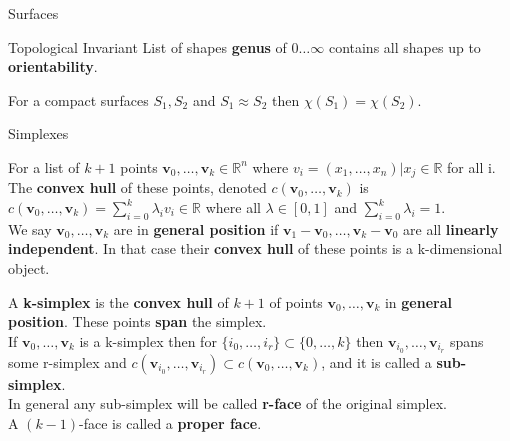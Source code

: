 \documentclass[12pt, letterpaper]{article}
\begin{document}
\begin{section}{Surfaces}
\begin{subsection}{Topological Invariant}
    List of shapes \textbf{genus} of \(0 \dots \infty\) contains all shapes
    up to \textbf{orientability}.

    For a compact surfaces \(S_{1}, S_{2}\) and \(S_{1} \approx S_{2}\) then
    \(\chi(S_{1}) = \chi(S_{2})\).

  \end{subsection}

  \begin{subsection}{Simplexes}

    For a list of \(k + 1\) points \(\textbf{v}_{0}, \dots , \textbf{v}_{k} \in \mathbb{R}^{n}\)
    where \(v_{i} = (x_{1}, \dots , x_{n}) | x_{j} \in \mathbb{R}\) for all i.
    The \textbf{convex hull} of these points, denoted \(c(\textbf{v}_{0}, \dots , \textbf{v}_{k})\) is
    \(c(\textbf{v}_{0}, \dots , \textbf{v}_{k}) = \sum_{i = 0}^{k}\lambda_{i}v_{i} \in \mathbb{R}\)
    where all \(\lambda \in [0, 1]\) and \(\sum_{i = 0}^{k}\lambda_{i} = 1\). \\
    We say \(\textbf{v}_{0}, \dots , \textbf{v}_{k}\) are in \textbf{general position} if
    \(\textbf{v}_{1} - \textbf{v}_{0}, \dots , \textbf{v}_{k} - \textbf{v}_{0}\)
    are all \textbf{linearly independent}. In that case their \textbf{convex hull}
    of these points is a k-dimensional object.

    A \textbf{k-simplex} is the \textbf{convex hull} of \(k + 1\) of points
    \(\textbf{v}_{0}, \dots , \textbf{v}_{k}\) in \textbf{general position}.
    These points \textbf{span} the simplex. \\
    If \(\textbf{v}_{0}, \dots , \textbf{v}_{k}\) is a k-simplex then for
    \(\{ i_{0}, \dots , i_{r} \} \subset \{ 0, \dots , k \}\) then
    \(\textbf{v}_{i_{0}}, \dots , \textbf{v}_{i_{r}}\) spans some r-simplex and
    \(c(\textbf{v}_{i_{0}}, \dots , \textbf{v}_{i_{r}}) \subset
    c(\textbf{v}_{0}, \dots , \textbf{v}_{k})\), and it is called a \textbf{sub-simplex}. \\
    In general any sub-simplex will be called \textbf{r-face} of the original simplex. \\
    A \((k - 1)\)-face is called a \textbf{proper face}.


\end{subsection}
\end{section}
\end{document}

